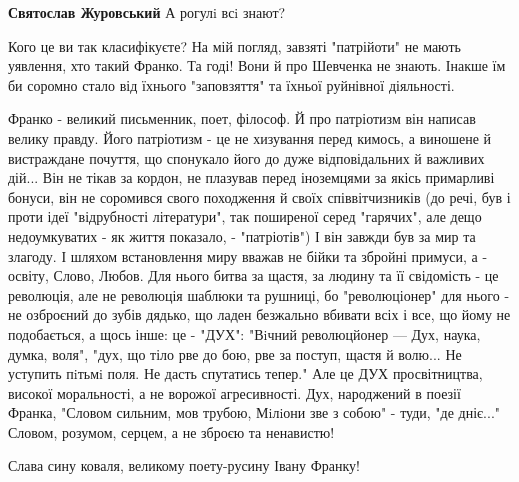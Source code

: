 \begin{itemize}
\begin{itemize}
\textbf{Святослав Журовський} А рогулi всi знают?

 

Кого це ви так класифікуєте? На мій погляд, завзяті "патрійоти" не мають
уявлення, хто такий Франко. Та годі! Вони й про Шевченка не знають. Інакше їм
би соромно стало від їхнього "заповзяття" та їхньої руйнівної діяльності.


\par
 

Франко - великий письменник, поет, філософ. Й про патріотизм він написав велику
правду. Його патріотизм - це не хизування перед кимось, а виношене й
вистраждане почуття, що спонукало його до дуже відповідальних й важливих дій...
Він не тікав за кордон, не плазував перед іноземцями за якісь примарливі
бонуси, він не соромився свого походження й своїх співвітчизників (до речі, був
і проти ідеї "відрубності літератури", так поширеної серед "гарячих", але дещо
недоумкуватих - як життя показало, - "патріотів") І він завжди був за мир та
злагоду. І шляхом встановлення миру вважав не бійки та збройні примуси, а -
освіту, Слово, Любов. Для нього битва за щастя, за людину та її свідомість - це
революція, але не революція шаблюки та рушниці, бо "революціонер" для нього -
не озброєний до зубів дядько, що ладен безжально вбивати всіх і все, що йому не
подобається, а щось інше: це - "ДУХ": "Вiчний революцйонер — Дух, наука, думка,
воля", "дух, що тіло рве до бою, рве за поступ, щастя й волю... Не уступить
пiтьмi поля. Не дасть спутатись тепер." Але це ДУХ просвітництва, високої
моральності, а не ворожої агресивності. Дух, народжений в поезії Франка,
"Словом сильним, мов трубою, Мiлiони зве з собою" - туди, "де дніє..." Словом,
розумом, серцем, а не зброєю та ненавистю!

Слава сину коваля, великому поету-русину Івану Франку!


 

\end{itemize}
\end{itemize}
